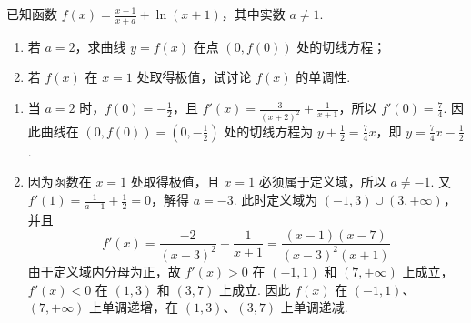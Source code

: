 \begin{problem}
已知函数 \( f(x) = \frac{x - 1}{x + a} + \ln\left(x + 1\right) \)，其中实数 \( a \neq 1 \).

\begin{enumerate}
\item 若 \(a = 2\)，求曲线 \(y = f(x)\) 在点 \((0, f(0))\) 处的切线方程；
\item 若 \( f(x) \) 在 \( x = 1 \) 处取得极值，试讨论 \( f(x) \) 的单调性.
\end{enumerate}

\begin{solution}
\begin{enumerate}
\item 当 \(a=2\) 时，\(f(0)=-\frac{1}{2}\)，且 \(f'(x)=\frac{3}{(x+2)^2}+\frac{1}{x+1}\)，所以 \(f'(0)=\frac{7}{4}\). 因此曲线在 \((0,f(0))=\left(0,-\frac{1}{2}\right)\) 处的切线方程为 \(y+\frac{1}{2}=\frac{7}{4}x\)，即 \(y=\frac{7}{4}x-\frac{1}{2}\).
\item 因为函数在 \(x=1\) 处取得极值，且 \(x=1\) 必须属于定义域，所以 \(a\neq-1\). 又 \(f'(1)=\frac{1}{a+1}+\frac{1}{2}=0\)，解得 \(a=-3\). 此时定义域为 \((-1,3)\cup(3,+\infty)\)，并且
\[
f'(x)=\frac{-2}{(x-3)^2}+\frac{1}{x+1}=\frac{(x-1)(x-7)}{(x-3)^2(x+1)}
\]
由于定义域内分母为正，故 \(f'(x)>0\) 在 \((-1,1)\) 和 \((7,+\infty)\) 上成立，\(f'(x)<0\) 在 \((1,3)\) 和 \((3,7)\) 上成立. 因此 \(f(x)\) 在 \((-1,1)\)、\((7,+\infty)\) 上单调递增，在 \((1,3)\)、\((3,7)\) 上单调递减.
\end{enumerate}
\end{solution}
\end{problem}


